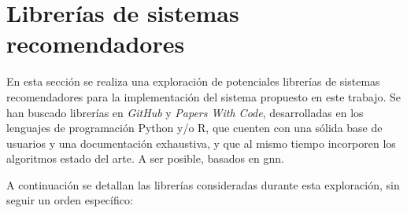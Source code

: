 

\section{Librerías de sistemas recomendadores}

En esta sección se realiza una exploración de potenciales librerías de sistemas recomendadores para la implementación del sistema propuesto en este trabajo. Se han buscado librerías en \textit{GitHub} y \textit{Papers With Code}, desarrolladas en los lenguajes de programación Python y/o R, que cuenten con una sólida base de usuarios y una documentación exhaustiva, y que al mismo tiempo incorporen los algoritmos estado del arte. A ser posible, basados en \gls{gnn}.

A continuación se detallan las librerías consideradas durante esta exploración, sin seguir un orden específico:

